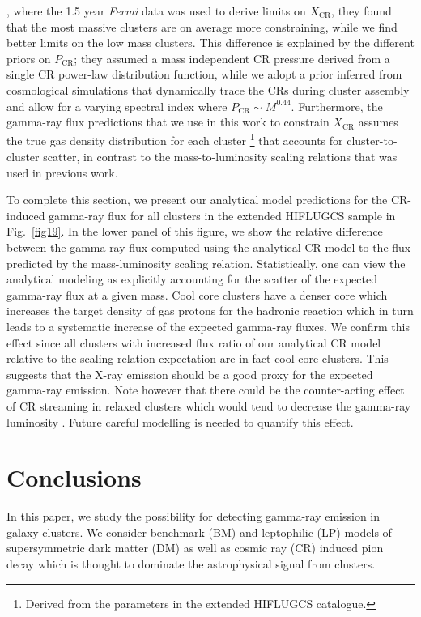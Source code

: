 \documentclass[10pt,aps,pra,reprint,amsmath,amsfonts,amssymb,showpacs,nofootinbib,floatfix]{revtex4-1}
\newcommand{\Fermi}{{\em Fermi}\xspace}
\newcommand{\rmn}{\mathrm}
\newcommand{\CR}{\rmn{CR}}
\begin{document}
{  \cite{2010ApJ...717L..71A}, where the 1.5 year \Fermi data was used
  to derive limits on $X_\CR$, they found that the most massive
  clusters are on average more constraining, while we find better
  limits on the low mass clusters. This difference is explained by the
  different priors on $P_\CR$; they assumed a mass independent CR
  pressure derived from a single CR power-law distribution function,
  while we adopt a prior inferred from cosmological simulations that
  dynamically trace the CRs during cluster assembly and allow for a
  varying spectral index where $P_\CR\sim M^{0.44}$. Furthermore, the
  gamma-ray flux predictions that we use in this work to constrain
  $X_\CR$ assumes the true gas density distribution for each cluster
  \footnote{Derived from the parameters in the extended HIFLUGCS
    catalogue.} that accounts for cluster-to-cluster scatter, in
  contrast to the mass-to-luminosity scaling relations that was used
  in previous work.}

To complete this section, we present our analytical model predictions
for the CR-induced gamma-ray flux for all clusters in the extended
HIFLUGCS sample in Fig.~\ref{fig19}. In the lower panel of this
figure, we show the relative difference between the gamma-ray flux
computed using the analytical CR model to the flux predicted by the
mass-luminosity scaling relation. Statistically, one can view the
analytical modeling as explicitly accounting for the scatter of the expected
gamma-ray flux at a given mass. Cool core clusters have a denser core
which increases the target density of gas protons for the hadronic
reaction which in turn leads to a systematic increase of the expected
gamma-ray fluxes. We confirm this effect since all clusters with
increased flux ratio of our analytical CR model relative to the scaling relation
expectation are in fact cool core clusters. This suggests that the X-ray
emission should be a good proxy for the expected gamma-ray
emission. Note however that there could be the counter-acting effect
of CR streaming in relaxed clusters which would tend to decrease the
gamma-ray luminosity \cite{2011A&A...527A..99E}. Future careful
modelling is needed to quantify this effect.



\section{Conclusions}

In this paper, we study the possibility for detecting gamma-ray
emission in galaxy clusters. We consider benchmark (BM) and
leptophilic (LP) models of supersymmetric dark matter (DM) as well as
cosmic ray (CR) induced pion decay which is thought to dominate the
astrophysical signal from clusters. 
\end{document}
